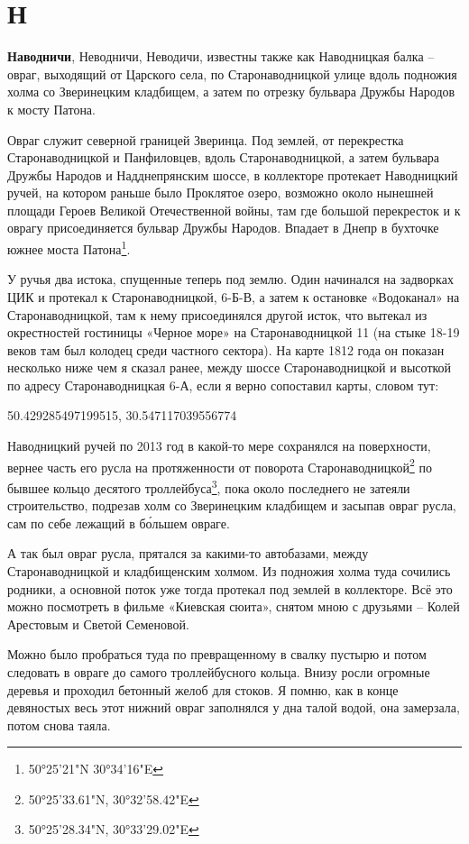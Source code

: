 \chapter*{Н}

\textbf{Наводничи}, Неводничи, Неводичи,  известны также как Наводницкая балка – овраг, выходящий от Царского села, по Старонаводницкой улице вдоль подножия холма со Зверинецким кладбищем, а затем по отрезку бульвара Дружбы Народов к мосту Патона. 

Овраг служит северной границей Зверинца. Под землей, от перекрестка Старонаводницкой и Панфиловцев, вдоль Старонаводницкой, а затем бульвара Дружбы Народов и Надднепрянским шоссе, в коллекторе протекает Наводницкий ручей, на котором раньше было Проклятое озеро, возможно около нынешней площади Героев Великой Отечественной войны, там где большой перекресток и к оврагу присоединяется бульвар Дружбы Народов. Впадает в Днепр в бухточке южнее моста Патона\footnote{50°25'21"N 30°34'16"E}.

У ручья два истока, спущенные теперь под землю. Один начинался на задворках ЦИК и протекал к Старонаводницкой, 6-Б-В, а затем к остановке «Водоканал» на Старонаводницкой, там к нему присоединялся другой исток, что вытекал из окрестностей гостиницы «Черное море» на Старонаводницкой 11 (на стыке 18-19 веков там был колодец среди частного сектора). На карте 1812 года он показан несколько ниже чем я сказал ранее, между шоссе Старонаводницкой и высоткой по адресу Старонаводницкая 6-А, если я верно сопоставил карты, словом тут:

50.429285497199515, 30.547117039556774

Наводницкий ручей по 2013 год в какой-то мере сохранялся на поверхности, вернее часть его русла на протяженности от поворота Старонаводницкой\footnote{50°25'33.61"N, 30°32'58.42"E} по бывшее кольцо десятого троллейбуса\footnote{ 50°25'28.34"N, 30°33'29.02"E}, пока около последнего не затеяли строительство, подрезав холм со Зверинецким кладбищем и засыпав овраг русла, сам по себе лежащий в б\'ольшем овраге. 

А так был овраг русла, прятался за какими-то автобазами, между Старонаводницкой и кладбищенским холмом. Из подножия холма туда сочились родники, а основной поток уже тогда протекал под землей в коллекторе. Всё это можно посмотреть в фильме «Киевская сюита», снятом мною с друзьями – Колей Арестовым и Светой Семеновой.

Можно было пробраться туда по превращенному в свалку пустырю и потом следовать в овраге до самого троллейбусного кольца. Внизу росли огромные деревья и проходил бетонный желоб для стоков. Я помню, как в конце девяностых весь этот нижний овраг заполнялся у дна талой водой, она замерзала, потом снова таяла.

